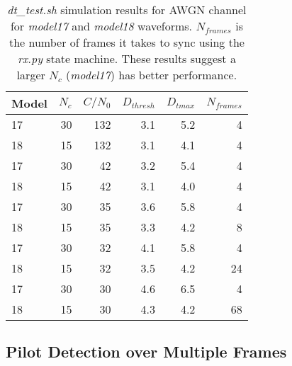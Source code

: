 \documentclass{article}
\begin{document}
\begin{table} [H]
\centering
\begin{tabular}{l r r r r r}
 \hline
 Model  & $N_c$ & $C/N_0$ & $D_{thresh}$ & $D_{tmax}$ & $N_{frames}$ \\
 \hline
 17 & 30 & 132 & 3.1 & 5.2 & 4  \\
 18 & 15 & 132 & 3.1 & 4.1 & 4 \\
 17 & 30 & 42 & 3.2 & 5.4 & 4 \\
 18 & 15 & 42 & 3.1 & 4.0 & 4 \\
 17 & 30 & 35 & 3.6 & 5.8 & 4 \\
 18 & 15 & 35 & 3.3 & 4.2 & 8 \\
 17 & 30 & 32 & 4.1 & 5.8 & 4 \\
 18 & 15 & 32 & 3.5 & 4.2 & 24 \\
 17 & 30 & 30 & 4.6 & 6.5 & 4 \\
 18 & 15 & 30 & 4.3 & 4.2 & 68 \\
 \hline
\end{tabular}
\caption{\emph{dt\_test.sh} simulation results for AWGN channel for \emph{model17} and \emph{model18} waveforms. $N_{frames}$ is the number of frames it takes to sync using the \emph{rx.py} state machine. These results suggest a larger $N_c$ (\emph{model17}) has better performance.}
\label{tab:acq_dtmax}
\end{table}

\subsection{Pilot Detection over Multiple Frames}
\label{sec:pilot_detection}
\end{document}
